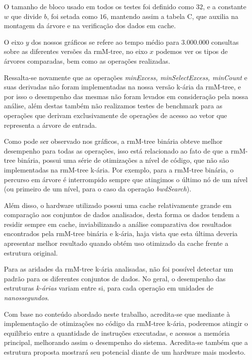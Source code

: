  O tamanho de bloco usado em todos os testes foi definido como $32$, e a constante $w$ que divide $b$, foi setada como $16$, mantendo assim a tabela C, que auxilia na montagem da árvore e na verificação dos dados em cache.

O eixo $y$ dos nossos gráficos se refere ao tempo médio para $3.000.000$ consultas sobre as diferentes versões da rmM-tree, no eixo $x$ podemos ver os tipos de árvores comparadas, bem como as operações realizadas. 

Ressalta-se novamente que as operações \textit{minExcess, minSelectExcess, minCount} e suas derivadas não foram implementadas na nossa versão k-ária da rmM-tree, e por isso o desempenho das mesmas não foram levados em consideração pela nossa análise, além destas também não realizamos testes de benchmark para as operações que derivam exclusivamente de operações de acesso ao vetor que representa a árvore de entrada.

Como pode ser observado nos gráficos, a rmM-tree binária obteve melhor desempenho para todas as operações, isso está relacionado ao fato de que a rmM-tree binária, possui uma série de otimizações a nível de código, que não são implementadas na rmM-tree k-ária. Por exemplo, para a rmM-tree binária, o percurso em árvore é interrompido sempre que atingimos o último nó de um nível (ou primeiro de um nível, para o caso da operação \textit{bwdSearch}).

Além disso, o hardware utilizado possui uma cache relativamente grande em comparação aos conjuntos de dados analisados, desta forma os dados tendem a residir sempre em cache, inviabilizando a análise comparativa dos resultados encontrados pela rmM-tree binária e k-ária, haja vista que esta última deveria apresentar melhor resultado quando obtém uso otimizado da cache frente a estrutura original. 

Para as aridades da rmM-tree k-ária analisadas, não foi possível detectar um padrão para os diferentes conjuntos de dados. No geral, o desempenho das estruturas \textit{k-árias} variam entre si, para cada operação em unidades de \textit{nanossegundos}. 

Com base no conteúdo abordado neste trabalho, acredita-se que mediante à implementação de otimizações no código da rmM-tree k-ária, poderemos atingir o equilíbrio entre a quantidade de instruções executadas, e acessos a memória principal, melhorando assim o desempenho do sistema. Acredita-se também que a estrutura proposta mostrará seu potencial diante de um hardware mais modesto.

